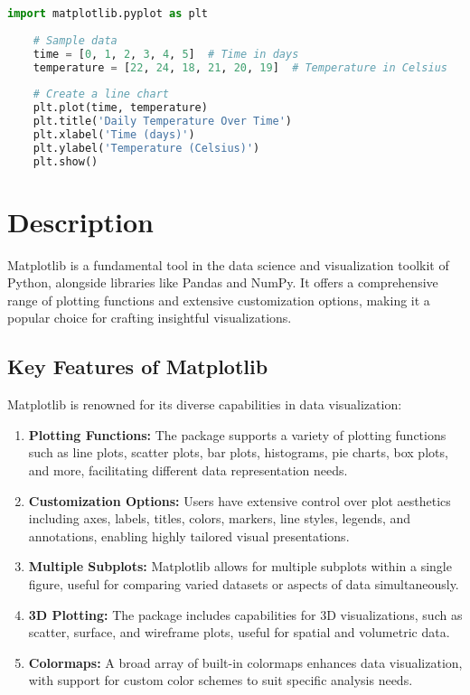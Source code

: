 \begin{lstlisting}[language=Python, caption=Python Example: Plotting Daily Temperature]
	import matplotlib.pyplot as plt
	
	# Sample data
	time = [0, 1, 2, 3, 4, 5]  # Time in days
	temperature = [22, 24, 18, 21, 20, 19]  # Temperature in Celsius
	
	# Create a line chart
	plt.plot(time, temperature)
	plt.title('Daily Temperature Over Time')
	plt.xlabel('Time (days)')
	plt.ylabel('Temperature (Celsius)')
	plt.show()
\end{lstlisting}




\section{Description}

Matplotlib is a fundamental tool in the data science and visualization toolkit of Python, alongside libraries like Pandas and NumPy. It offers a comprehensive range of plotting functions and extensive customization options, making it a popular choice for crafting insightful visualizations.

\subsection{Key Features of Matplotlib}

Matplotlib is renowned for its diverse capabilities in data visualization:

\begin{enumerate}
	\item \textbf{Plotting Functions:} The package supports a variety of plotting functions such as line plots, scatter plots, bar plots, histograms, pie charts, box plots, and more, facilitating different data representation needs.
	\item \textbf{Customization Options:} Users have extensive control over plot aesthetics including axes, labels, titles, colors, markers, line styles, legends, and annotations, enabling highly tailored visual presentations.
	\item \textbf{Multiple Subplots:} Matplotlib allows for multiple subplots within a single figure, useful for comparing varied datasets or aspects of data simultaneously.
	\item \textbf{3D Plotting:} The package includes capabilities for 3D visualizations, such as scatter, surface, and wireframe plots, useful for spatial and volumetric data.
	\item \textbf{Colormaps:} A broad array of built-in colormaps enhances data visualization, with support for custom color schemes to suit specific analysis needs.\cite{Matplotlib:2024}
\end{enumerate}

